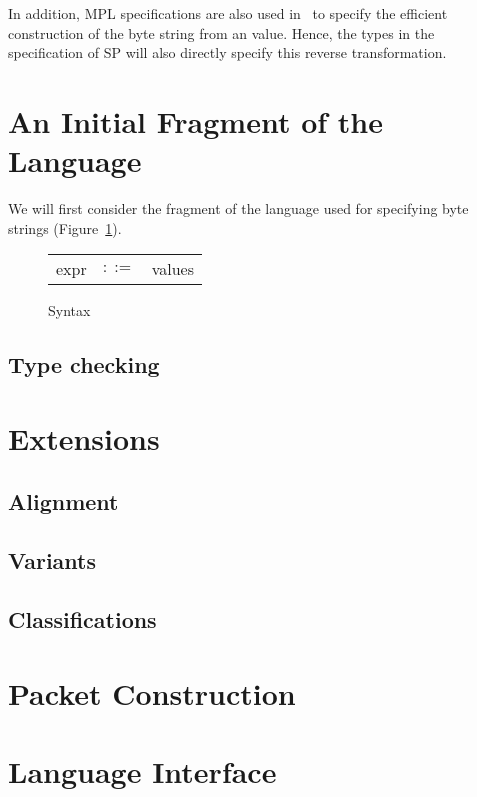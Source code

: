 \documentclass{article}
\begin{document}
In addition, MPL specifications are also used
in~\cite{Madhavapeddy:thesis} to specify the efficient construction of
the byte string from an \OCaml value.  Hence, the types in the
specification of SP will also directly specify this reverse
transformation.

\section{An Initial Fragment of the Language}

We will first consider the fragment of the language used for
specifying byte strings (Figure~\ref{fig:syntax1}).

\begin{figure}
\begin{tabular}{rcl}
expr & $::=$ & values \\
\end{tabular}
\caption{Syntax}
\label{fig:syntax1}
\end{figure}

\subsection{Type checking}

\section{Extensions}

\subsection{Alignment}
\subsection{Variants}
\subsection{Classifications}

\section{Packet Construction}

\section{Language Interface}



\end{document}
